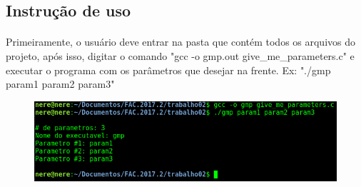 \documentclass[a4paper, 12pt]{article}
\begin{document}
	\subsection{Instru\c{c}\~ao de uso}
        \paragraph{}    Primeiramente, o usu\'ario deve entrar na pasta que cont\'em todos os arquivos do projeto, ap\'os isso, digitar o comando "gcc -o gmp.out give\_me\_parameters.c" e executar o programa com os par\^ametros que desejar na frente. Ex: "./gmp param1 param2 param3"
        
\begin{figure}[H]
	\centering
	\includegraphics[scale=0.5]{img2.png}
\end{figure}
\end{document}

